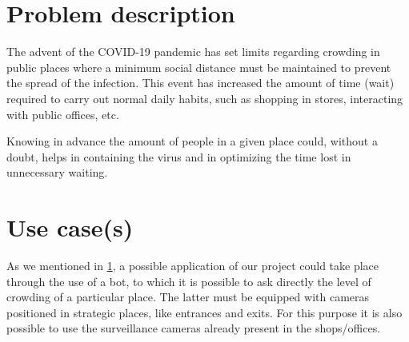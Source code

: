 \section{Problem description}\label{sec:prob_desc}
The advent of the COVID-19 pandemic has set limits regarding crowding in public places where a minimum social distance must be maintained to prevent the spread of the infection. This event has increased the amount of time (wait) required to carry out normal daily habits, such as shopping in stores, interacting with public offices, etc.

Knowing in advance the amount of people in a given place could, without a doubt, helps in containing the virus and in optimizing the time lost in unnecessary waiting.
\section{Use case(s)}
As we mentioned in \ref{sec:prob_desc}, a possible application of our project could take place through the use of a bot, to which it is possible to ask directly the level of crowding of a particular place. The latter must be equipped with cameras positioned in strategic places, like entrances and exits. For this purpose it is also possible to use the surveillance cameras already present in the shops/offices.

